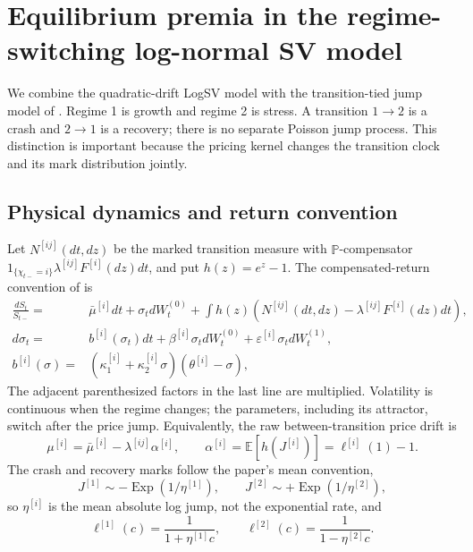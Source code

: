 \documentclass[11pt]{article}
\theoremstyle{remark}
\newcommand{\E}{\mathbb{E}}
\newcommand{\PP}{\mathbb{P}}
\begin{document}
\section{Equilibrium premia in the regime-switching log-normal SV model}\label{sec:regime}

We combine the quadratic-drift LogSV model with the transition-tied jump model of
\cite{Sepp2026gba}.  Regime 1 is growth and regime 2 is stress.  A transition
$1\to2$ is a crash and $2\to1$ is a recovery; there is no separate Poisson jump
process.  This distinction is important because the pricing kernel changes the
transition clock and its mark distribution jointly.

\subsection{Physical dynamics and return convention}

Let $N^{[ij]}(dt,dz)$ be the marked transition measure with $\PP$-compensator
$1_{\{\chi_{t-}=i\}}\lambda^{[ij]}F^{[i]}(dz)dt$, and put $h(z)=e^{z}-1$.
The compensated-return convention of \cite{Sepp2026gba} is
\begin{equation}\label{eq:regime_sv}
\begin{split}
\frac{dS_t}{S_{t-}}={}&\bar\mu^{[i]}dt+\sigma_t dW_t^{(0)}
 +\int h(z)\left(N^{[ij]}(dt,dz)-\lambda^{[ij]}F^{[i]}(dz)dt\right),\\
d\sigma_t={}&b^{[i]}(\sigma_t)dt+\beta^{[i]}\sigma_t dW_t^{(0)}
 +\varepsilon^{[i]}\sigma_t dW_t^{(1)},\\
b^{[i]}(\sigma)={}&(\kappa_1^{[i]}+\kappa_2^{[i]}\sigma)
(\theta^{[i]}-\sigma),
\end{split}
\end{equation}
The adjacent parenthesized factors in the last line are multiplied.
Volatility is continuous when the regime changes; the parameters, including its
attractor, switch after the price jump.  Equivalently, the raw between-transition
price drift is
\begin{equation}\label{eq:regime_drift_convention}
\mu^{[i]}=\bar\mu^{[i]}-\lambda^{[ij]}\alpha^{[i]},
\qquad \alpha^{[i]}=\E[h(J^{[i]})]=\ell^{[i]}(1)-1.
\end{equation}
The crash and recovery marks follow the paper's mean convention,
\begin{equation}\label{eq:regime_jump_laws}
J^{[1]}\sim-\operatorname{Exp}(1/\eta^{[1]}),\qquad
J^{[2]}\sim+\operatorname{Exp}(1/\eta^{[2]}),
\end{equation}
so $\eta^{[i]}$ is the mean absolute log jump, not the exponential rate, and
\begin{equation}\label{eq:regime_jump_mgf}
\ell^{[1]}(c)=\frac{1}{1+\eta^{[1]}c},\qquad
\ell^{[2]}(c)=\frac{1}{1-\eta^{[2]}c}.
\end{equation}
\end{document}
